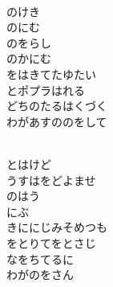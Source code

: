 \documentclass[10pt,b5j]{tarticle} %
\begin{document}
\begin{enumerate}
\begin{minipage}[c]{\blocksize}
        \vspace{\linespace}
        \item~\\
        のけき\\
        のにむ\\
        のをらし\\
        のかにむ\\
        をはきてたゆたい\\
        とポプラはれる\\
        どちのたるはくづく\\
        わがあすののをして
        
        \vspace{\linespace}
        \item~\\
        とはけど\\
        うすはをどよませ\\
        のはう\\
        にぶ\\
        きににじみそめつも\\
        をとりてをとさじ\\
        なをちてるに\\
        わがのをさん
    
    \end{minipage}
\end{enumerate} %
\end{document}
